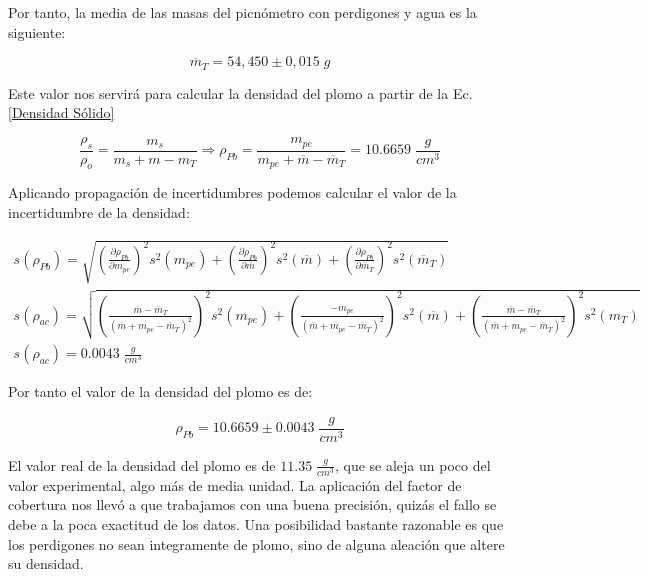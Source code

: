 \documentclass[a4paper,12pt,titlepage]{report}
\begin{document}
Por tanto, la media de las masas del picnómetro con perdigones y agua es la siguiente:

\begin{equation}
    \overline{m}_{T}=54,450 \pm 0,015 \; g
\end{equation}

Este valor nos servirá para calcular la densidad del plomo a partir de la Ec.\ref{Densidad Sólido}

\begin{equation}
    \frac{\rho_{s}}{\rho_{o}}=\frac{m_{s}}{m_{s}+m-m_{T}} \Rightarrow \rho_{Pb} = \frac{m_{pe}}{m_{pe}+\overline{m}-\overline{m}_{T}} = 10.6659\;  \frac{g}{cm^3}
\end{equation}

Aplicando propagación de incertidumbres podemos calcular el valor de la incertidumbre de la densidad:

\begin{gather}
    s(\rho_{Pb}) = \sqrt{\left (\frac{\partial \rho_{Pb}}{\partial m_{pe}} \right )^2 s^2(m_{pe})  +  \left (\frac{\partial \rho_{Pb}}{\partial \overline{m}} \right )^2 s^2(\overline{m})  +  \left (\frac{\partial \rho_{Pb}}{\partial \overline{m}_{T}} \right )^2 s^2(\overline{m}_{T})} \\ \textstyle
    s(\rho_{ac}) =
    \sqrt{\left (\frac{\overline{m}-\overline{m}_{T}}{(\overline{m}+m_{pe}-\overline{m}_{T})^2} \right )^2 s^2(m_{pe})  +  \left (\frac{-m_{pe}}{(\overline{m}+m_{pe}-\overline{m}_{T})^2} \right )^2 s^2(\overline{m})  +  \left (\frac{\overline{m}-\overline{m}_{T}}{(\overline{m}+m_{pe}-\overline{m}_{T})^2} \right )^2 s^2(m_{T})}\nonumber  \\
    s(\rho_{ac}) = 0.0043 \; \frac{g}{cm^3} \nonumber
\end{gather}

Por tanto el valor de la densidad del plomo es de:

\begin{equation}
    \rho_{Pb} = 10.6659 \pm 0.0043 \; \frac{g}{cm^3}
\end{equation}

El valor real de la densidad del plomo es de $11.35 \; \frac{g}{cm^3}$, que se aleja un poco del valor experimental, algo más de media unidad. La aplicación del factor de cobertura nos llevó a que trabajamos con una buena precisión, quizás el fallo se debe a la poca exactitud de los datos. Una posibilidad bastante razonable es que los perdigones no sean integramente de plomo, sino de alguna aleación que altere su densidad.
\end{document}
